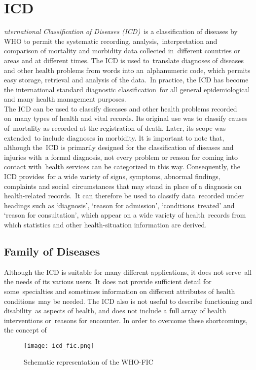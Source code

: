   \section[International Classification of Diseases (ICD) ]{ICD}
  \label{sec:icd}

  \textit{nternational Classification of Diseases (ICD)}\
  is a classification of diseases by WHO to permit the systematic recording, analysis,\
  interpretation and comparison of mortality and morbidity data collected in\
  different countries or areas and at different times. The ICD is used to\
  translate diagnoses of diseases and other health problems from words into an\
  alphanumeric code, which permits easy storage, retrieval and analysis of the data.\
  In practice, the ICD has become the international standard diagnostic classification\
  for all general epidemiological and many health management purposes.\\
  
  \noindent The ICD can be used to classify diseases and other health problems recorded on\
  many types of health and vital records. Its original use was to classify causes of\
  mortality as recorded at the registration of death. Later, its scope was extended\
  to include diagnoses in morbidity. It is important to note that, although the\
  ICD is primarily designed for the classification of diseases and injuries with\
  a formal diagnosis, not every problem or reason for coming into contact with\
  health services can be categorized in this way. Consequently, the ICD provides\
  for a wide variety of signs, symptoms, abnormal findings, complaints and social\
  circumstances that may stand in place of a diagnosis on health-related records.\
  It can therefore be used to classify data\
  recorded under headings such as `diagnosis', `reason for admission', `conditions\
  treated' and `reason for consultation', which appear on a wide variety of health\
  records from which statistics and other health-situation information are derived.\\
  
  \subsection{Family of Diseases}
  Although the ICD is suitable for many different applications, it does not serve\
  all the needs of its various users. It does not provide sufficient detail for some\
  specialties and sometimes information on different attributes of health conditions\
  may be needed. The ICD also is not useful to describe functioning and disability\
  as aspects of health, and does not include a full array of health interventions or\
  reasons for encounter. In order to overcome these shortcomings, the concept of\
  \begin{figure}[!ht]
    \centering
    \texttt{[image: icd\_fic.png]}
    \caption{Schematic representation of the WHO-FIC\
    \citep{icd10_instruction_manual_-_volume_2_international_2010}}
    \label{fig:icd_fic}
  \end{figure}
  

